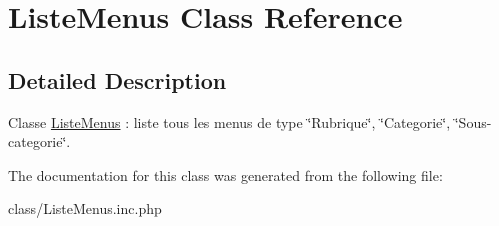 \hypertarget{class_liste_menus}{
\section{ListeMenus Class Reference}
\label{class_liste_menus}
}


\subsection{Detailed Description}
Classe \hyperlink{class_liste_menus}{ListeMenus} : liste tous les menus de type \char`\"{}Rubrique\char`\"{}, \char`\"{}Categorie\char`\"{}, \char`\"{}Sous-\/categorie\char`\"{}. 

The documentation for this class was generated from the following file:\begin{DoxyCompactItemize}
\item 
class/ListeMenus.inc.php\end{DoxyCompactItemize}
